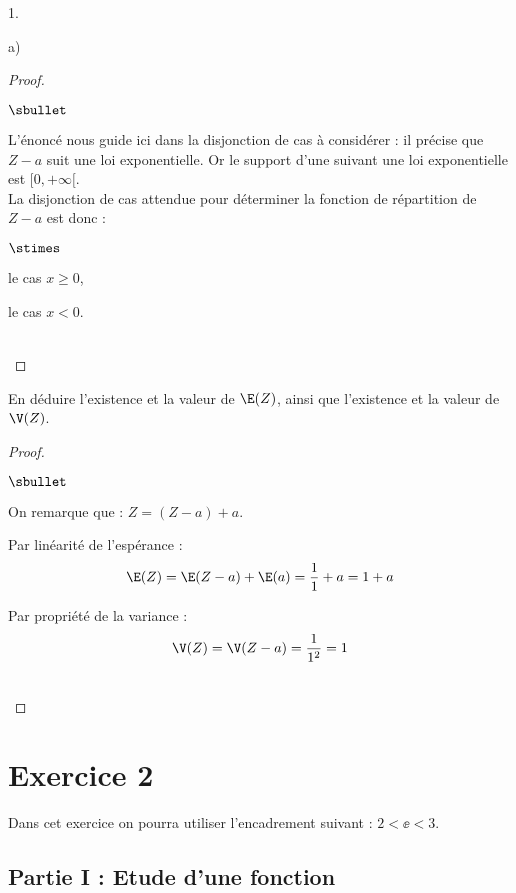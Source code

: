 \documentclass[11pt]{article}%
\begin{document}
\begin{noliste}{1.}
\begin{noliste}{a)}
\begin{proof}
\begin{remark}
\begin{noliste}{$\sbullet$}
   \item L'énoncé nous guide ici dans la disjonction de cas à
     considérer : il précise que $Z-a$ suit une loi exponentielle. Or
     le support d'une \var suivant une loi exponentielle est
     $[0,+\infty[$.\\
     La disjonction de cas attendue pour déterminer la fonction de
     répartition de $Z-a$ est donc :
     \begin{noliste}{$\stimes$}
      \item le cas $x \geq 0$,
      \item le cas $x<0$.
     \end{noliste}
    \end{noliste}
   \end{remark}~\\[-1.4cm]
  \end{proof}

  
  \item En déduire l'existence et la valeur de $\E(Z)$, ainsi que 
  l'existence et la valeur de $\V(Z)$.
  
  \begin{proof}~
   \begin{noliste}{$\sbullet$}
    \item On remarque que : $Z = (Z-a) +a$.
    
    \item Par linéarité de l'espérance :
    \[
     \E(Z) = \E(Z-a) + \E(a) = \dfrac{1}{1} + a = 1+a
    \]
    \item Par propriété de la variance :
    \[
     \V(Z) = \V(Z-a)=\dfrac{1}{1^2} = 1
    \]
   \end{noliste}
   ~\\[-1.2cm]
  \end{proof}

 \end{noliste}
\end{noliste}

\section*{Exercice 2}

\noindent
Dans cet exercice on pourra utiliser l'encadrement suivant : $2 < \ee
< 3$.

\subsection*{Partie I : Etude d'une fonction}
\end{document}
